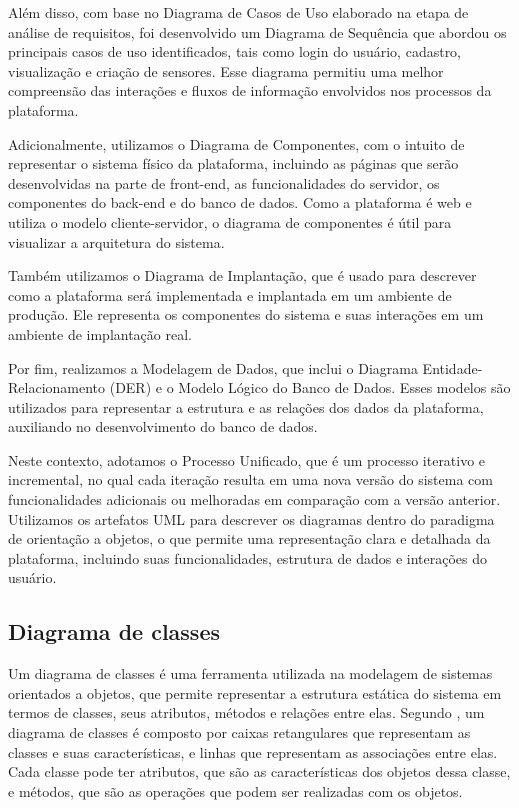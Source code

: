 \documentclass[tcc,capa]{texufpel}
\begin{document}
Além disso, com base no Diagrama de Casos de Uso elaborado na etapa de análise de requisitos, foi desenvolvido um Diagrama de Sequência que abordou os principais casos de uso identificados, tais como login do usuário, cadastro, visualização e criação de sensores. Esse diagrama permitiu uma melhor compreensão das interações e fluxos de informação envolvidos nos processos da plataforma.

Adicionalmente, utilizamos o Diagrama de Componentes, com o intuito de representar o sistema físico da plataforma, incluindo as páginas que serão desenvolvidas na parte de front-end, as funcionalidades do servidor, os componentes do back-end e do banco de dados. Como a plataforma é web e utiliza o modelo cliente-servidor, o diagrama de componentes é útil para visualizar a arquitetura do sistema.

Também utilizamos o Diagrama de Implantação, que é usado para descrever como a plataforma será implementada e implantada em um ambiente de produção. Ele representa os componentes do sistema e suas interações em um ambiente de implantação real.

Por fim, realizamos a Modelagem de Dados, que inclui o Diagrama Entidade-Relacionamento (DER) e o Modelo Lógico do Banco de Dados. Esses modelos são utilizados para representar a estrutura e as relações dos dados da plataforma, auxiliando no desenvolvimento do banco de dados.

Neste contexto, adotamos o Processo Unificado, que é um processo iterativo e incremental, no qual cada iteração resulta em uma nova versão do sistema com funcionalidades adicionais ou melhoradas em comparação com a versão anterior. Utilizamos os artefatos UML para descrever os diagramas dentro do paradigma de orientação a objetos, o que permite uma representação clara e detalhada da plataforma, incluindo suas funcionalidades, estrutura de dados e interações do usuário.

\subsection{Diagrama de classes}
Um diagrama de classes é uma ferramenta utilizada na modelagem de sistemas orientados a objetos, que permite representar a estrutura estática do sistema em termos de classes, seus atributos, métodos e relações entre elas. Segundo \citet{BOOCH:2007}, um diagrama de classes é composto por caixas retangulares que representam as classes e suas características, e linhas que representam as associações entre elas. Cada classe pode ter atributos, que são as características dos objetos dessa classe, e métodos, que são as operações que podem ser realizadas com os objetos.
\end{document}
